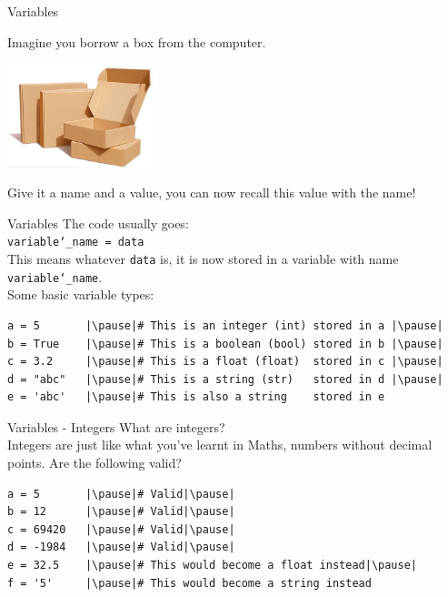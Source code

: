 \documentclass[dvipsnames, svgnames, x11names]{beamer}
\begin{document}
\begin{frame}[fragile]{Variables}
\begin{center}
Imagine you borrow a box from the computer.

\includegraphics[height=3cm]{box}

\pause
Give it a name and a value, you can now recall this value with the name!
\end{center}
\end{frame}

\begin{frame}[fragile]{Variables}
The code usually goes:\\
\texttt{variable\char`\_name = data}\\
This means whatever \texttt{data} is, it is now stored in a variable with name \texttt{variable\char`\_name}.
\vspace{1em}\\
Some basic variable types:
\begin{verbatim}
a = 5       |\pause|# This is an integer (int) stored in a |\pause|
b = True    |\pause|# This is a boolean (bool) stored in b |\pause|
c = 3.2     |\pause|# This is a float (float)  stored in c |\pause|
d = "abc"   |\pause|# This is a string (str)   stored in d |\pause|
e = 'abc'   |\pause|# This is also a string    stored in e
\end{verbatim}
\end{frame}

\begin{frame}[fragile]{Variables - Integers}
What are integers?\pause\\
Integers are just like what you've learnt in Maths, numbers without decimal points. Are the following valid?\pause
\begin{verbatim}
a = 5       |\pause|# Valid|\pause|
b = 12      |\pause|# Valid|\pause|
c = 69420   |\pause|# Valid|\pause|
d = -1984   |\pause|# Valid|\pause|
e = 32.5    |\pause|# This would become a float instead|\pause|
f = '5'     |\pause|# This would become a string instead
\end{verbatim}
\end{frame}
\end{document}
